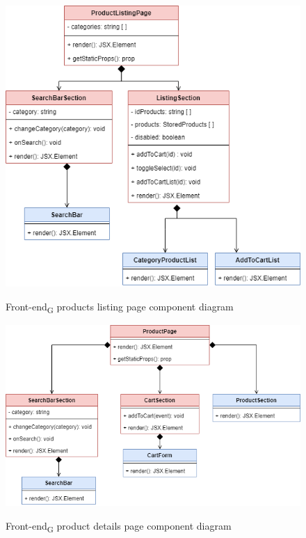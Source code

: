 \begin{figure}[H]
\centering
\includegraphics[scale=0.50]{res/Architettura/Frontend/img/plp}\\
\caption{Front-end\textsubscript{G} products listing page component diagram}
\end{figure}

\begin{figure}[H]
\centering
\includegraphics[scale=0.50]{res/Architettura/Frontend/img/pdp}\\
\caption{Front-end\textsubscript{G} product details page component diagram}
\end{figure}

